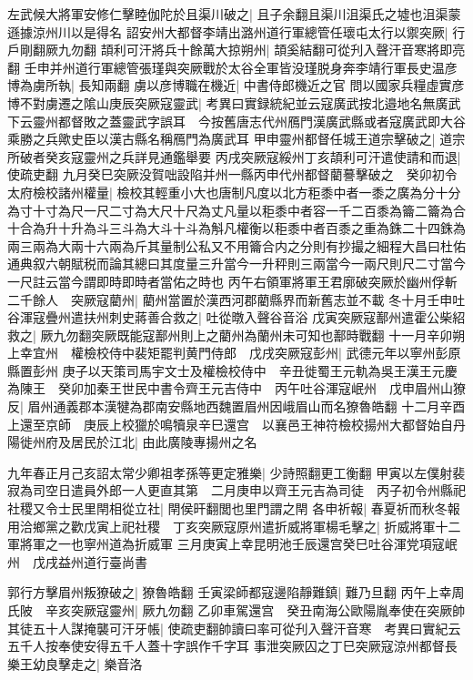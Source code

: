 左武候大將軍安修仁擊睦伽陀於且渠川破之|{
	且子余翻且渠川沮渠氏之墟也沮渠蒙遜據涼州川以是得名}
詔安州大都督李靖出潞州道行軍總管任瓌屯太行以禦突厥|{
	行戶剛翻厥九勿翻}
頡利可汗將兵十餘萬大掠朔州|{
	頡奚結翻可從刋入聲汗音寒將即亮翻}
壬申并州道行軍總管張瑾與突厥戰於太谷全軍皆没瑾脱身奔李靖行軍長史温彦博為虜所執|{
	長知兩翻}
虜以彦博職在機近|{
	中書侍郎機近之官}
問以國家兵糧虛實彦博不對虜遷之隂山庚辰突厥寇靈武|{
	考異曰實録統紀並云寇廣武按北邉地名無廣武下云靈州都督敗之蓋靈武字誤耳　今按舊唐志代州鴈門漢廣武縣或者寇廣武即大谷乘勝之兵歟史臣以漢古縣名稱鴈門為廣武耳}
甲申靈州都督任城王道宗擊破之|{
	道宗所破者癸亥寇靈州之兵詳見通鑑舉要}
丙戌突厥寇綏州丁亥頡利可汗遣使請和而退|{
	使疏吏翻}
九月癸巳突厥没賀咄設陷并州一縣丙申代州都督藺謩擊破之　癸卯初令太府檢校諸州權量|{
	檢校其輕重小大也唐制凡度以北方秬黍中者一黍之廣為分十分為寸十寸為尺一尺二寸為大尺十尺為丈凡量以秬黍中者容一千二百黍為籥二籥為合十合為升十升為斗三斗為大斗十斗為斛凡權衡以秬黍中者百黍之重為銖二十四銖為兩三兩為大兩十六兩為斤其量制公私又不用籥合内之分則有抄撮之細程大昌曰杜佑通典叙六朝賦税而論其總曰其度量三升當今一升秤則三兩當今一兩尺則尺二寸當今一尺註云當今謂即時即時者當佑之時也}
丙午右領軍將軍王君廓破突厥於幽州俘斬二千餘人　突厥寇藺州|{
	藺州當置於漢西河郡藺縣界而新舊志並不載}
冬十月壬申吐谷渾寇疊州遣扶州刺史蔣善合救之|{
	吐從暾入聲谷音浴}
戊寅突厥寇鄯州遣霍公柴紹救之|{
	厥九勿翻突厥既能寇鄯州則上之藺州為蘭州未可知也鄯時戰翻}
十一月辛卯朔上幸宜州　權檢校侍中裴矩罷判黄門侍郎　戊戌突厥寇彭州|{
	武德元年以寧州彭原縣置彭州}
庚子以天策司馬宇文士及權檢校侍中　辛丑徙蜀王元軌為吳王漢王元慶為陳王　癸卯加秦王世民中書令齊王元吉侍中　丙午吐谷渾寇岷州　戊申眉州山獠反|{
	眉州通義郡本漢犍為郡南安縣地西魏置眉州因峨眉山而名獠魯皓翻}
十二月辛酉上還至京師　庚辰上校獵於鳴犢泉辛巳還宫　以襄邑王神符檢校揚州大都督始自丹陽徙州府及居民於江北|{
	由此廣陵專揚州之名}


九年春正月己亥詔太常少卿祖孝孫等更定雅樂|{
	少詩照翻更工衡翻}
甲寅以左僕射裴寂為司空日遣員外郎一人更直其第　二月庚申以齊王元吉為司徒　丙子初令州縣祀社稷又令士民里閈相從立社|{
	閈侯旰翻閭也里門謂之閈}
各申祈報|{
	春夏祈而秋冬報}
用洽鄉黨之歡戊寅上祀社稷　丁亥突厥寇原州遣折威將軍楊毛擊之|{
	折威將軍十二軍將軍之一也寧州道為折威軍}
三月庚寅上幸昆明池壬辰還宫癸巳吐谷渾党項寇岷州　戊戌益州道行臺尚書

郭行方擊眉州叛獠破之|{
	獠魯皓翻}
壬寅梁師都寇邊陷靜難鎮|{
	難乃旦翻}
丙午上幸周氏陂　辛亥突厥寇靈州|{
	厥九勿翻}
乙卯車駕還宫　癸丑南海公歐陽胤奉使在突厥帥其徒五十人謀掩襲可汗牙帳|{
	使疏吏翻帥讀曰率可從刋入聲汗音寒　考異曰實紀云五千人按奉使安得五千人蓋十字誤作千字耳}
事泄突厥囚之丁巳突厥寇涼州都督長樂王幼良擊走之|{
	樂音洛}


